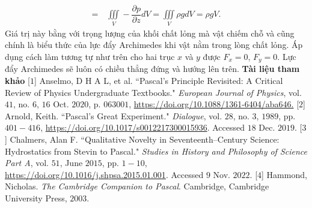 \begin{multicols}{2}
\begin{align*}
		= \,&\iiint\limits_V - \dfrac{\partial p}{\partial z}dV = \iiint\limits_V \rho g dV = \rho gV.
	\end{align*}
	Giá trị này bằng với trọng lượng của khối chất lỏng mà vật chiếm chỗ và cũng chính là biểu thức của lực đẩy Archimedes khi vật nằm trong lòng chất lỏng. Áp dụng cách làm tương tự như trên cho hai trục $x$ và $y$ được $F_x=0$, $F_y=0$. Lực đẩy Archimedes sẽ luôn có chiều thẳng đứng và hướng lên trên.
	\vskip 0.1cm
	\textbf{\color{timhieukhoahoc}Tài liệu tham khảo}
	\vskip 0.1cm
	[$1$] Anselmo, D H A L, et al. ``Pascal's Principle Revisited: A Critical Review of Physics Undergraduate Textbooks." \textit{European Journal of Physics}, vol. $41$, no. $6$, $16$ Oct. $2020$, p. $063001$, \url{https://doi.org/10.1088/1361-6404/aba646.}
	\vskip 0.1cm
	[$2$] Arnold, Keith. ``Pascal's Great Experiment." \textit{Dialogue}, vol. $28$, no. $3$, $1989$, pp. $401-416$, \url{https://doi.org/10.1017/s0012217300015936}. Accessed $18$ Dec. $2019$.
	\vskip 0.1cm
	[$3$] Chalmers, Alan F. ``Qualitative Novelty in Seventeenth--Century Science: Hydrostatics from Stevin to Pascal." \textit{Studies in History and Philosophy of Science Part A}, vol. $51$, June $2015$, pp. $1-10$, \url{https://doi.org/10.1016/j.shpsa.2015.01.001}. Accessed $9$ Nov. $2022$.
	\vskip 0.1cm
	[$4$] Hammond, Nicholas. \textit{The Cambridge Companion to Pascal}. Cambridge, Cambridge University Press, $2003$.
\end{multicols}
